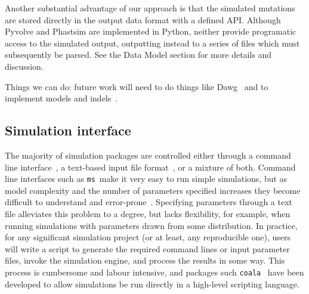 \documentclass{article}
\newcommand{\ms}[0]{\texttt{ms}}
\begin{document}
Another substantial advantage of our approach is that the simulated
mutations are stored directly in the output data format with
a defined API. Although
Pyvolve and Phastsim are implemented in Python, neither provide
programatic access to the simulated output, outputting instead
to a series of files which must subsequently be parsed.
See the Data Model section for more details and discussion.

Things we can do: future work will need to do things like
Dawg~\citep{cartwright2005dna} and to implement models and
indels~\citep{fletcher2009indelible}.

\subsection*{Simulation interface}

The majority of simulation packages are controlled either through
a command line interface~\citep[e.g.][]{hudson2002generating,kern2016discoal},
a text-based input file
format~\citep[e.g.][]{guillaume2006nemo,excoffier2011fastsimcoal,shlyakhter2014cosi2},
or a mixture of both.
Command line interfaces such as \ms\ make it very easy to run simple
simulations, but as model complexity and the number of parameters specified increases
they become difficult to understand and
error-prone~\citep{ragsdale2020lessons,gower2021demes}.
Specifying parameters through a text file alleviates this problem to a degree,
but lacks flexibility, for example, when running simulations with parameters
drawn from some distribution. In practice, for any significant simulation
project (or at least, any reproducible one), users will write a script
to generate the required command lines or input parameter files,
invoke the simulation engine, and process the results in some way.
This process is cumbersome and labour intensive, and packages
such \texttt{coala}~\citep{staab2016coala} have been developed
to allow simulations be run directly in a high-level
scripting language.
\end{document}
